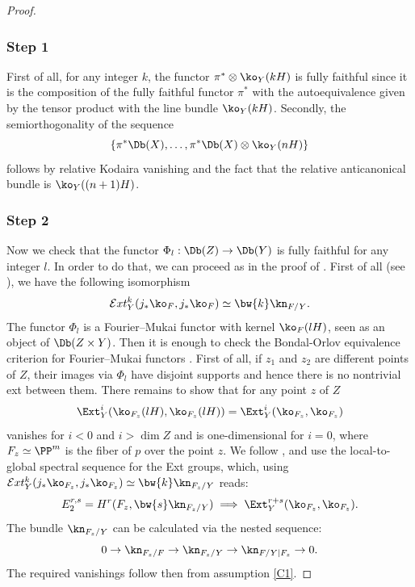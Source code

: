 \skpt
\begin{proof}\vspace*{-8pt}
\subsubsection*{Step 1}
First of all, for any integer $k$, the functor $\pi^* \otimes \ko_Y(kH)$ is fully faithful since it
is the composition of the fully faithful functor $\pi^*$ with the autoequivalence given by the tensor
product with the line bundle $\ko_Y(kH)$. Secondly, the semiorthogonality of the
sequence
\[
\{ \pi^*\Db(X),\ldots,\pi^*\Db(X)\otimes \ko_Y(nH) \}
\]
follows by
relative Kodaira vanishing and the fact that the relative anticanonical bundle is $\ko_Y((n+1)H)$.

\subsubsection*{Step 2}
Now we check that the functor $\Phi_l : \Db(Z) \to \Db(Y)$ is fully faithful for any
integer $l$.
In order to do that, we can proceed as in the proof of \cite[Prop.\,11.16]{Huybook}.
First of all (see \cite[Prop.\,11.8]{Huybook}), we have the following isomorphism
\[
{\mathcal{E}}xt_Y^k (j_*\ko_F,j_*\ko_F) \simeq \bw{k} \kn_{F/Y}.
\]
The functor $\Phi_l$ is a Fourier--Mukai functor with kernel $\ko_F(lH)$, seen as an object of
$\Db(Z \times Y)$. Then it is enough to check the Bondal-Orlov equivalence criterion for Fourier--Mukai
functors \cite{bondal-orlov-archive}. First of all, if $z_1$ and $z_2$ are different points of $Z$,
their images via $\Phi_l$ have disjoint supports and hence there is no nontrivial ext between them.
There remains to show that for any
point $z$ of $Z$
\[
\Ext^i_Y(\ko_{F_z}(lH),\ko_{F_z}(lH)) = \Ext^i_Y(\ko_{F_z},\ko_{F_z})
\]
vanishes for $i<0$ and $i>\dim Z$ and is one-dimensional for $i=0$, where $F_z \simeq \PP^m$
is the fiber of $p$ over the point $z$. We follow \cite[Prop.\,11.16]{Huybook}, and use the local-to-global
spectral sequence for the Ext groups, which, using
${\mathcal{E}}xt_Y^k (j_*\ko_{F_z},j_*\ko_{F_z}) \simeq \bw{k} \kn_{F_z/Y}$ reads:\vspace*{-3pt}
\[
E^{r,s}_2=H^r(F_z,\bw{s} \kn_{F_z/Y}) \implies \Ext_Y^{r+s}(\ko_{F_z},\ko_{F_z}).
\]
The bundle $\kn_{F_z/Y}$ can be calculated via the nested sequence:\vspace*{-3pt}
\[
0 \to \kn_{F_z/F} \to \kn_{F_z/Y} \to \kn_{F/Y \vert F_z} \to 0.
\]
The required vanishings follow then from assumption \eqref{C1}.


\end{proof}
